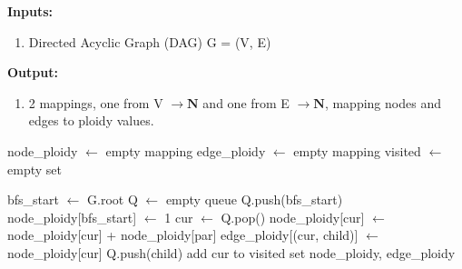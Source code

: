 \documentclass{article}
\begin{document}
\begin{algorithm}[H]
\caption{CalculatePloidy}\label{euclid}

\textbf{Inputs:} 
\begin{enumerate}
    \item Directed Acyclic Graph (DAG) G = (V, E)
    
\end{enumerate}
\textbf{Output:}
\begin{enumerate}
    \item 2 mappings, one from V $\rightarrow \mathbf{N}$ and one from E $\rightarrow \mathbf{N}$, mapping nodes and edges to ploidy values.
\end{enumerate}

  \begin{algorithmic}[1]
        \State node\_ploidy $\gets$ empty mapping
        \State edge\_ploidy $\gets$ empty mapping
        \State visited $\gets$ empty set
        
        \State bfs\_start $\gets$ G.root
        \State Q $\gets$ empty queue
        \State Q.push(bfs\_start)
        \State node\_ploidy[bfs\_start] $\gets$ 1 
            \State cur $\gets$ Q.pop()
                 
                    \State node\_ploidy[cur] $\gets$ node\_ploidy[cur] + node\_ploidy[par] 
                \EndFor
                 
                    \State edge\_ploidy[(cur, child)] $\gets$ node\_ploidy[cur]
                    \State Q.push(child)
                \EndFor
            \EndIf
            \State add cur to visited set
        \EndWhile
    \State \Return node\_ploidy, edge\_ploidy
    \EndProcedure
  \end{algorithmic}


\end{algorithm}
\end{document}
